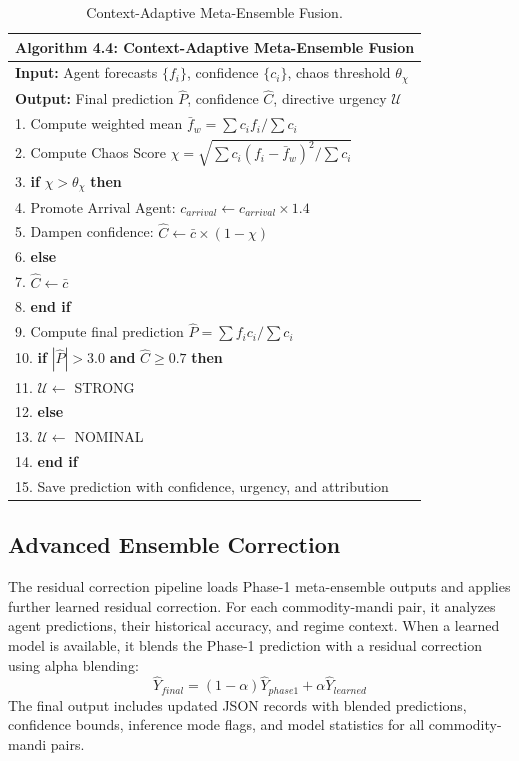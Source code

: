 \documentclass[12pt,a4paper]{report}
\theoremstyle{definition}
\theoremstyle{remark}
\begin{document}
\begin{table}[htbp]
\centering
\caption{Context-Adaptive Meta-Ensemble Fusion.}
\label{alg:meta}
\begin{tabular}{p{14cm}}
\hline
\textbf{Algorithm 4.4:} Context-Adaptive Meta-Ensemble Fusion \\
\hline
\textbf{Input:} Agent forecasts $\{f_i\}$, confidence $\{c_i\}$, chaos threshold $\theta_\chi$ \\
\textbf{Output:} Final prediction $\hat{P}$, confidence $\hat{C}$, directive urgency $\mathcal{U}$ \\
\hline
1. Compute weighted mean $\bar{f}_w = \sum c_i f_i / \sum c_i$ \\
2. Compute Chaos Score $\chi = \sqrt{\sum c_i(f_i - \bar{f}_w)^2 / \sum c_i}$ \\
3. \textbf{if} $\chi > \theta_\chi$ \textbf{then} \\
4. \quad Promote Arrival Agent: $c_{arrival} \leftarrow c_{arrival} \times 1.4$ \\
5. \quad Dampen confidence: $\hat{C} \leftarrow \bar{c} \times (1 - \chi)$ \\
6. \textbf{else} \\
7. \quad $\hat{C} \leftarrow \bar{c}$ \\
8. \textbf{end if} \\
9. Compute final prediction $\hat{P} = \sum f_i c_i / \sum c_i$ \\
10. \textbf{if} $|\hat{P}| > 3.0$ \textbf{and} $\hat{C} \geq 0.7$ \textbf{then} \\
11. \quad $\mathcal{U} \leftarrow$ STRONG \\
12. \textbf{else} \\
13. \quad $\mathcal{U} \leftarrow$ NOMINAL \\
14. \textbf{end if} \\
15. Save prediction with confidence, urgency, and attribution \\
\hline
\end{tabular}
\end{table}

\subsection{Advanced Ensemble Correction}

The residual correction pipeline loads Phase-1 meta-ensemble outputs and applies further learned residual correction. For each commodity-mandi pair, it analyzes agent predictions, their historical accuracy, and regime context. When a learned model is available, it blends the Phase-1 prediction with a residual correction using alpha blending:
\begin{equation}
\hat{Y}_{final} = (1 - \alpha)\hat{Y}_{phase1} + \alpha \hat{Y}_{learned}
\end{equation}
The final output includes updated JSON records with blended predictions, confidence bounds, inference mode flags, and model statistics for all commodity-mandi pairs.
\end{document}
